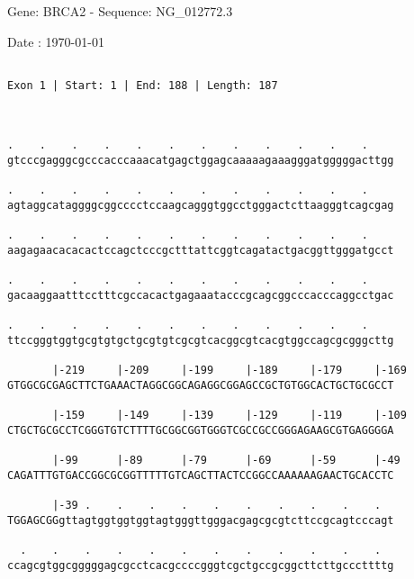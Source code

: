 \documentclass{article}
\begin{document}
\begin{center}
\begin{large}
 Gene: BRCA2 - Sequence: NG\_012772.3
 
 Date : \today
\end{large}
\end{center}
 \begin{Verbatim}
 
Exon 1 | Start: 1 | End: 188 | Length: 187



.    .    .    .    .    .    .    .    .    .    .    .    
gtcccgagggcgcccacccaaacatgagctggagcaaaaagaaagggatgggggacttgg
                                                            
.    .    .    .    .    .    .    .    .    .    .    .    
agtaggcataggggcggcccctccaagcagggtggcctgggactcttaagggtcagcgag
                                                            
.    .    .    .    .    .    .    .    .    .    .    .    
aagagaacacacactccagctcccgctttattcggtcagatactgacggttgggatgcct
                                                            
.    .    .    .    .    .    .    .    .    .    .    .    
gacaaggaatttcctttcgccacactgagaaatacccgcagcggcccacccaggcctgac
                                                            
.    .    .    .    .    .    .    .    .    .    .    .    
ttccgggtggtgcgtgtgctgcgtgtcgcgtcacggcgtcacgtggccagcgcgggcttg
                                                            
       |-219     |-209     |-199     |-189     |-179     |-169
GTGGCGCGAGCTTCTGAAACTAGGCGGCAGAGGCGGAGCCGCTGTGGCACTGCTGCGCCT
                                                            
       |-159     |-149     |-139     |-129     |-119     |-109
CTGCTGCGCCTCGGGTGTCTTTTGCGGCGGTGGGTCGCCGCCGGGAGAAGCGTGAGGGGA
                                                            
       |-99      |-89      |-79      |-69      |-59      |-49
CAGATTTGTGACCGGCGCGGTTTTTGTCAGCTTACTCCGGCCAAAAAAGAACTGCACCTC
                                                            
       |-39 .    .    .    .    .    .    .    .    .    .  
TGGAGCGGgttagtggtggtggtagtgggttgggacgagcgcgtcttccgcagtcccagt
                                                            
  .    .    .    .    .    .    .    .    .    .    .    .  
ccagcgtggcgggggagcgcctcacgccccgggtcgctgccgcggcttcttgcccttttg
                                                            

\end{Verbatim}
\end{document}
